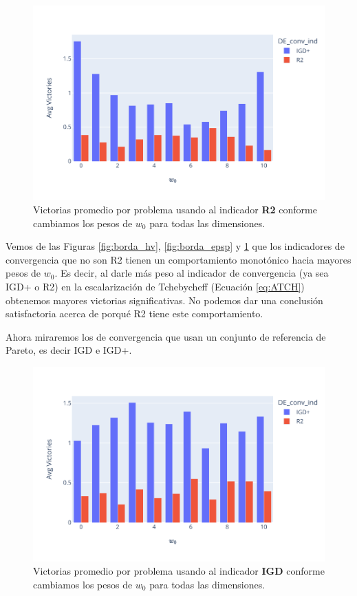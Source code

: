 \begin{figure} [H]
    \centering
    \includegraphics[width=\textwidth]{Figuras/borda_obj_ind_r2.pdf}
\caption[Conteo de borda R2]{Victorias promedio por problema usando al indicador \textbf{R2} conforme cambiamos los pesos de $w_0$ para todas las dimensiones.}
\label{fig:borda_R2}
\end{figure}

Vemos de las Figuras \ref{fig:borda_hv}, \ref{fig:borda_epsp} y \ref{fig:borda_R2} que los indicadores de convergencia que no son R2 tienen un comportamiento monotónico hacia mayores pesos de $w_0$. Es decir, al darle más peso al indicador de convergencia (ya sea IGD+ o R2) en la escalarización de Tchebycheff (Ecuación \ref{eq:ATCH}) obtenemos mayores victorias significativas. No podemos dar una conclusión satisfactoria acerca de porqué R2 tiene este comportamiento.

Ahora miraremos los de convergencia que usan un conjunto de referencia de Pareto, es decir IGD e IGD+. 

\begin{figure} [H]
    \centering
\includegraphics[width=\textwidth]{Figuras/borda_obj_ind_igd.pdf}
\caption[Conteo de borda IGD]{Victorias promedio por problema usando al indicador \textbf{IGD} conforme cambiamos los pesos de $w_0$ para todas las dimensiones.}
\label{fig:borda_igd}
\end{figure}

